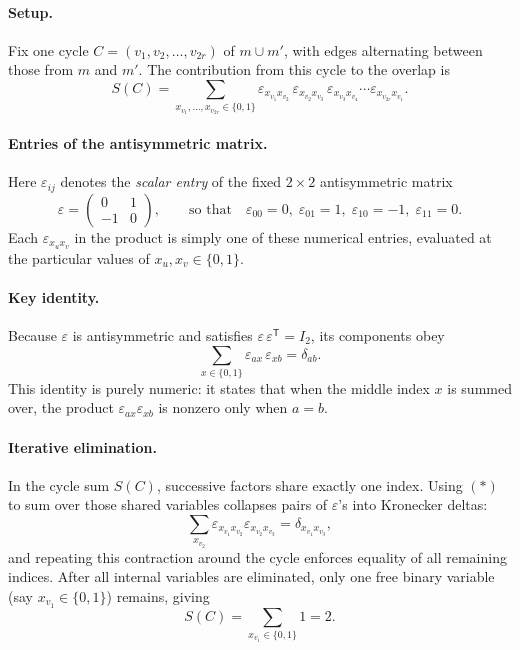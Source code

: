 \documentclass[11pt]{article}
\begin{document}
\paragraph{Setup.}
Fix one cycle $C=(v_1,v_2,\dots,v_{2r})$ of $m\cup m'$,
with edges alternating between those from $m$ and $m'$.
The contribution from this cycle to the overlap is
\[
S(C)
=\sum_{x_{v_1},\dots,x_{v_{2r}}\in\{0,1\}}
\varepsilon_{x_{v_1}x_{v_2}}\,
\varepsilon_{x_{v_2}x_{v_3}}\,
\varepsilon_{x_{v_3}x_{v_4}}\cdots
\varepsilon_{x_{v_{2r}}x_{v_1}}.
\]

\paragraph{Entries of the antisymmetric matrix.}
Here $\varepsilon_{ij}$ denotes the \emph{scalar entry} of the fixed $2\times2$
antisymmetric matrix
\[
\varepsilon=
\begin{pmatrix}
0 & 1\\[2pt]
-1 & 0
\end{pmatrix},
\qquad
\text{so that}\quad
\varepsilon_{00}=0,\;
\varepsilon_{01}=1,\;
\varepsilon_{10}=-1,\;
\varepsilon_{11}=0.
\]
Each $\varepsilon_{x_u x_v}$ in the product is simply one of these numerical
entries, evaluated at the particular values of $x_u,x_v\in\{0,1\}$.

\paragraph{Key identity.}
Because $\varepsilon$ is antisymmetric and satisfies
$\varepsilon\,\varepsilon^{\mathsf T}=I_2$, its components obey
\[
\sum_{x\in\{0,1\}} \varepsilon_{a x}\,\varepsilon_{x b} = \delta_{ab}.
\tag{$\ast$}
\]
This identity is purely numeric: it states that when the middle index $x$ is
summed over, the product $\varepsilon_{a x}\varepsilon_{x b}$ is nonzero only
when $a=b$.

\paragraph{Iterative elimination.}
In the cycle sum $S(C)$, successive factors share exactly one index.
Using $(\ast)$ to sum over those shared variables collapses pairs of
$\varepsilon$'s into Kronecker deltas:
\[
\sum_{x_{v_2}}\varepsilon_{x_{v_1}x_{v_2}}\varepsilon_{x_{v_2}x_{v_3}}
=\delta_{x_{v_1}x_{v_3}},
\]
and repeating this contraction around the cycle enforces equality of all
remaining indices. After all internal variables are eliminated, only one free
binary variable (say $x_{v_1}\in\{0,1\}$) remains, giving
\[
S(C)=\sum_{x_{v_1}\in\{0,1\}}1=2.
\]
\end{document}
